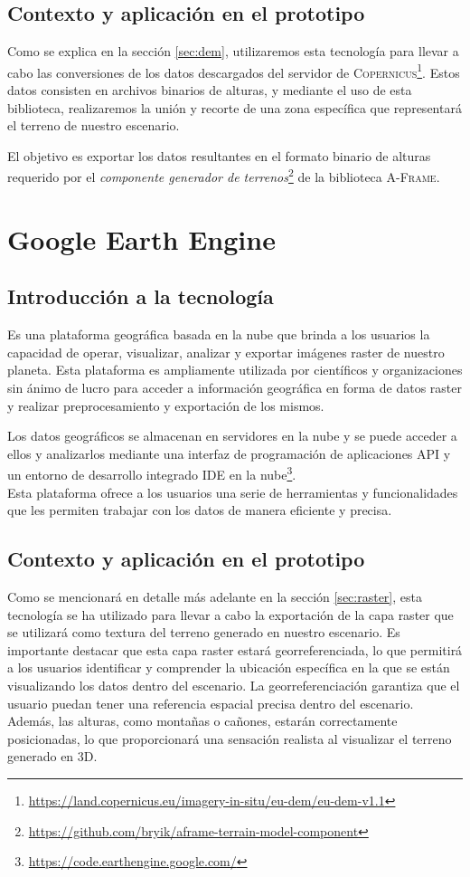 \documentclass[a4paper, 11pt]{book}
\begin{document}
\subsection{Contexto y aplicación en el prototipo}
Como se explica en la sección \ref{sec:dem}, utilizaremos esta tecnología para llevar a cabo las conversiones de los datos descargados del servidor de \textsc{Copernicus}\footnote{\url{https://land.copernicus.eu/imagery-in-situ/eu-dem/eu-dem-v1.1}}. Estos datos consisten en archivos binarios de alturas, y mediante el uso de esta biblioteca, realizaremos la unión y recorte de una zona específica que representará el terreno de nuestro escenario.

El objetivo es exportar los datos resultantes en el formato binario de alturas requerido por el \emph{componente generador de terrenos}\footnote{\url{https://github.com/bryik/aframe-terrain-model-component}} de la biblioteca \textsc{A-Frame}.
\section{Google Earth Engine}
\subsection{Introducción a la tecnología}
Es una plataforma geográfica basada en la nube que brinda a los usuarios la capacidad de operar, visualizar, analizar y exportar imágenes raster de nuestro planeta. Esta plataforma es ampliamente utilizada por científicos y organizaciones sin ánimo de lucro para acceder a información geográfica en forma de datos raster y realizar preprocesamiento y exportación de los mismos.

Los datos geográficos se almacenan en servidores en la nube y se puede acceder a ellos y analizarlos mediante una interfaz de programación de aplicaciones \textsc{API} y un entorno de desarrollo integrado \textsc{IDE} en la nube\footnote{\url{https://code.earthengine.google.com/}}. \\
Esta plataforma ofrece a los usuarios una serie de herramientas y funcionalidades que les permiten trabajar con los datos de manera eficiente y precisa.
\subsection{Contexto y aplicación en el prototipo}
Como se mencionará en detalle más adelante en la sección \ref{sec:raster}, esta tecnología se ha utilizado para llevar a cabo la exportación de la capa raster que se utilizará como textura del terreno generado en nuestro escenario. Es importante destacar que esta capa raster estará georreferenciada, lo que permitirá a los usuarios identificar y comprender la ubicación específica en la que se están visualizando los datos dentro del escenario.
La georreferenciación garantiza que el usuario puedan tener una referencia espacial precisa dentro del escenario. Además, las alturas, como montañas o cañones, estarán correctamente posicionadas, lo que proporcionará una sensación realista al visualizar el terreno generado en \textsc{3D}.
\end{document}
